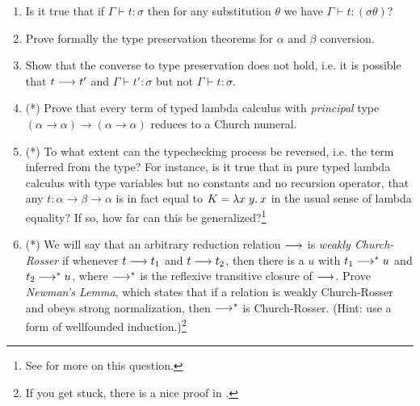 \begin{enumerate}

\item Is it true that if $\Gamma \vdash t:\sigma$ then for any substitution
$\theta$ we have $\Gamma \vdash t:(\sigma \theta)$?

\item Prove formally the type preservation theorems for $\alpha$ and $\beta$
conversion.

\item Show that the converse to type preservation does not hold, i.e. it is
possible that $t \longrightarrow t'$ and $\Gamma \vdash t':\sigma$ but not $\Gamma
\vdash t:\sigma$.

\item (*) Prove that every term of typed lambda calculus with {\em principal}
type $(\alpha \to \alpha) \to (\alpha \to \alpha)$ reduces to a Church numeral.

\item (*) To what extent can the typechecking process be reversed, i.e. the
term inferred from the type? For instance, is it true that in pure typed lambda
calculus with type variables but no constants and no recursion operator, that
any $t:\alpha \to \beta \to \alpha$ is in fact equal to $K = \lambda x\; y.\: x$ in
the usual sense of lambda equality? If so, how far can this be
generalized?\footnote{See  for more on this question.}

\item (*) We will say that an arbitrary reduction relation $\longrightarrow$ is {\em
weakly Church-Rosser} if whenever $t \longrightarrow t_1$ and $t \longrightarrow t_2$, then
there is a $u$ with $t_1 \longrightarrow^* u$ and $t_2 \longrightarrow^* u$, where $\longrightarrow^*$
is the reflexive transitive closure of $\longrightarrow$. Prove {\em Newman's Lemma},
which states that if a relation is weakly Church-Rosser and obeys strong
normalization, then $\longrightarrow^*$ is Church-Rosser. (Hint: use a form of
wellfounded induction.)\footnote{If you get stuck, there is a nice proof in
.}

\end{enumerate}
